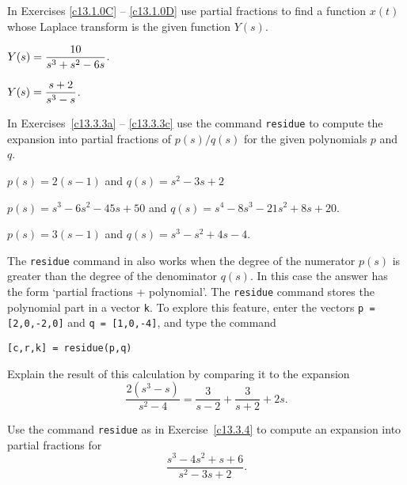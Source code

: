 \documentclass{ximera}
\begin{document}
\EXER

\TEXER

\noindent In Exercises \ref{c13.1.0C} -- \ref{c13.1.0D} use partial fractions
to find a function $x(t)$ whose Laplace transform is the given function
$Y(s)$.
\begin{exercise} \label{c13.1.0C}
$Y(s) = \displaystyle\frac{10}{s^3+s^2-6s}$.
\end{exercise}
\begin{exercise} \label{c13.1.0D}
$Y(s) = \displaystyle\frac{s+2}{s^3-s}$.
\end{exercise}



\CEXER



\noindent In Exercises~\ref{c13.3.3a} -- \ref{c13.3.3c} use the \Matlab 
command {\tt residue}
to compute the expansion into partial fractions of 
$p(s)/q(s)$ for the given polynomials $p$ and $q$.
\begin{exercise} \label{c13.3.3a}
$p(s)=2(s-1)$ and $q(s)=s^2-3s+2$
\end{exercise}
\begin{exercise} \label{c13.3.3b}
$p(s)=s^3-6s^2-45s+50$ and $q(s)=s^4-8s^3-21s^2+8s+20$.
\end{exercise}
\begin{exercise} \label{c13.3.3c}
$p(s)=3(s-1)$ and $q(s)=s^3-s^2+4s-4$.
\end{exercise}

\begin{exercise} \label{c13.3.4}
The {\tt residue} command in \Matlab also works when the degree of the
numerator $p(s)$ is greater than the degree of the denominator $q(s)$.
In this case the answer has the form `partial fractions + polynomial'.
The {\tt residue} command stores the polynomial part in a vector {\tt k}.
To explore this feature, enter the vectors {\tt p = [2,0,-2,0]} and
{\tt q = [1,0,-4]}, and type the command
\begin{verbatim}
[c,r,k] = residue(p,q)
\end{verbatim}
Explain the result of this calculation by comparing it to the expansion
\[
\frac{2(s^3-s)}{s^2-4} = \frac{3}{s-2} + \frac{3}{s+2} +2s.
\]
\end{exercise}

\begin{exercise} \label{c13.3.4b}
Use the command {\tt residue} as in Exercise~\ref{c13.3.4} to compute an 
expansion into partial fractions for
\[
\frac{s^3-4s^2+s+6}{s^2-3s+2}.
\]
\end{exercise}
\end{document}
